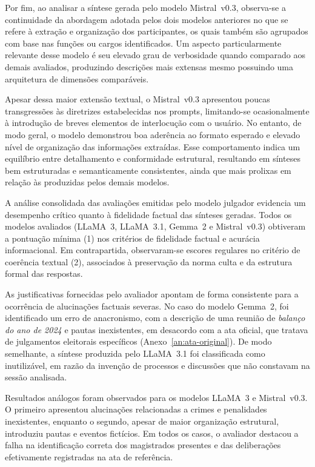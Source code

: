 Por fim, ao analisar a síntese gerada pelo modelo Mistral~v0.3, observa-se a continuidade da abordagem adotada pelos dois modelos anteriores no que se refere à extração e organização dos participantes, os quais também são agrupados com base nas funções ou cargos identificados. Um aspecto particularmente relevante desse modelo é seu elevado grau de verbosidade quando comparado aos demais avaliados, produzindo descrições mais extensas mesmo possuindo uma arquitetura de dimensões comparáveis.

Apesar dessa maior extensão textual, o Mistral~v0.3 apresentou poucas transgressões às diretrizes estabelecidas nos prompts, limitando-se ocasionalmente à introdução de breves elementos de interlocução com o usuário. No entanto, de modo geral, o modelo demonstrou boa aderência ao formato esperado e elevado nível de organização das informações extraídas. Esse comportamento indica um equilíbrio entre detalhamento e conformidade estrutural, resultando em sínteses bem estruturadas e semanticamente consistentes, ainda que mais prolixas em relação às produzidas pelos demais modelos.

A análise consolidada das avaliações emitidas pelo modelo julgador evidencia um desempenho crítico quanto à fidelidade factual das sínteses geradas. Todos os modelos avaliados (LLaMA~3, LLaMA~3.1, Gemma~2 e Mistral~v0.3) obtiveram a pontuação mínima (1) nos critérios de fidelidade factual e acurácia informacional. Em contrapartida, observaram-se escores regulares no critério de coerência textual (2), associados à preservação da norma culta e da estrutura formal das respostas.

As justificativas fornecidas pelo avaliador apontam de forma consistente para a ocorrência de alucinações factuais severas. No caso do modelo Gemma~2, foi identificado um erro de anacronismo, com a descrição de uma reunião de \textit{balanço do ano de 2024} e pautas inexistentes, em desacordo com a ata oficial, que tratava de julgamentos eleitorais específicos (Anexo~\ref{an:ata-original}). De modo semelhante, a síntese produzida pelo LLaMA~3.1 foi classificada como inutilizável, em razão da invenção de processos e discussões que não constavam na sessão analisada.

Resultados análogos foram observados para os modelos LLaMA~3 e Mistral~v0.3. O primeiro apresentou alucinações relacionadas a crimes e penalidades inexistentes, enquanto o segundo, apesar de maior organização estrutural, introduziu pautas e eventos fictícios. Em todos os casos, o avaliador destacou a falha na identificação correta dos magistrados presentes e das deliberações efetivamente registradas na ata de referência.

